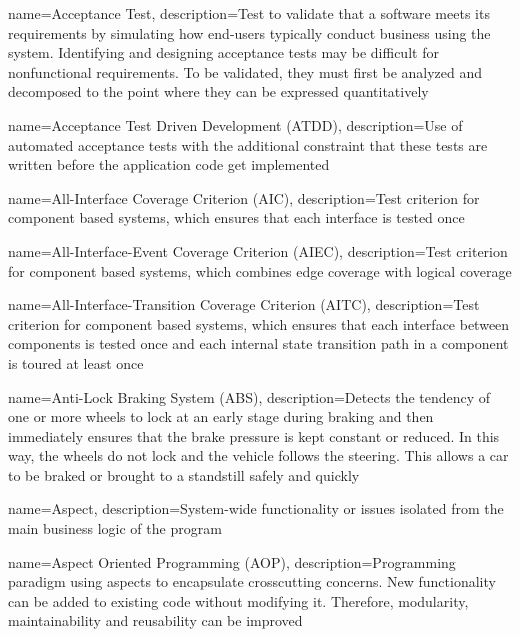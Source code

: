 {
	name={Acceptance Test},
	description={Test to validate that a software meets its requirements by simulating how end-users typically conduct business using the system. Identifying and designing acceptance tests may be difficult for nonfunctional requirements. To be validated, they must first be analyzed and decomposed to the point where they can be expressed quantitatively \cite{SWEBOK}}
}

{
	name={Acceptance Test Driven Development (ATDD)},
	description={Use of automated acceptance tests with the additional constraint that these tests are written before the application code get implemented \cite{longo}}
}

{
	name={All-Interface Coverage Criterion (AIC)},
	description={Test criterion for component based systems, which ensures that each interface is tested once \cite{Guan2015}}
}

{
	name={All-Interface-Event Coverage Criterion (AIEC)},
	description={Test criterion for component based systems, which combines edge coverage with logical coverage \cite{Guan2015}}
}

{
	name={All-Interface-Transition Coverage Criterion (AITC)},
	description={Test criterion for component based systems, which ensures that each interface between components is tested once and each internal state transition path in a component is toured at least once \cite{Guan2015}}
}

{
	name={Anti-Lock Braking System (ABS)},
	description={Detects the tendency of one or more wheels to lock at an early stage during braking and then immediately ensures that the brake pressure is kept constant or reduced. In this way, the wheels do not lock and the vehicle follows the steering. This allows a car to be braked or brought to a standstill safely and quickly \cite{Heinz2010}}
}

{
	name={Aspect},
	description={System-wide functionality or issues isolated from the main business logic of the program \cite{Kiczales1997}}
}

{
	name={Aspect Oriented Programming (AOP)},
	description={Programming paradigm using aspects to encapsulate crosscutting concerns. New functionality can be added to existing code without modifying it. Therefore, modularity, maintainability and reusability can be improved \cite{Kiczales1997}}
}

